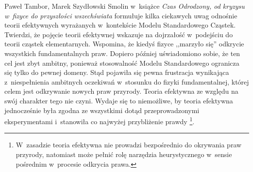 \begin{artplenv2auth}{Paweł Tambor, Marek Szydłowski}
Smolin w~książce \textit{Czas Odrodzony, od kryzysu w~fizyce do przyszłości wszechświata}
\parencite*[][]{smolin_czas_2015} %
 formułuje kilka ciekawych uwag odnośnie teorii efektywnych wyrażanych w~kontekście Modelu Standardowego Cząstek. Twierdzi, że pojęcie teorii efektywnej wskazuje na dojrzałość w~podejściu do teorii cząstek elementarnych. Wspomina, że kiedyś fizyce ,,marzyło się'' odkrycie wszystkich fundamentalnych praw. Dopiero później uświadomiono sobie, że ten cel jest zbyt ambitny, ponieważ stosowalność Modelu Standardowego ogranicza się tylko do pewnej domeny. Stąd pojawiła się pewna frustracja wynikająca z~niespełnienia ambitnych oczekiwań w~stosunku do fizyki fundamentalnej, której celem jest odkrywanie nowych praw przyrody. Teoria efektywna ze względu na swój charakter tego nie czyni. Wydaje się to niemożliwe, by teoria efektywna jednocześnie była zgodna ze wszystkimi dotąd przeprowadzonymi eksperymentami i~stanowiła co najwyżej przybliżenie prawdy 
\parencite[][s.~165]{smolin_czas_2015}%
\footnote{W~zasadzie teoria efektywna nie prowadzi bezpośrednio do okrywania praw przyrody, natomiast może pełnić rolę narzędzia heurystycznego w~sensie pośrednim w~procesie odkrycia prawa.}.


\end{artplenv2auth}
